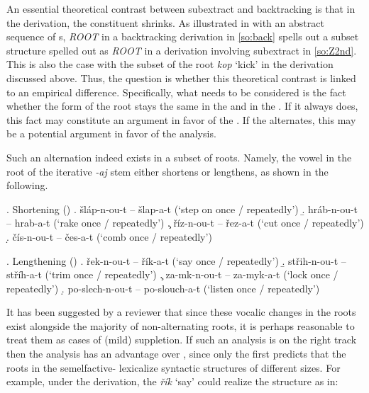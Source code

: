 An essential theoretical contrast between subextract and backtracking is that in the  derivation, the  constituent shrinks.  As illustrated in  with an abstract sequence of s, \textit{ROOT} in a backtracking derivation in \ref{so:back} spells out a subset structure spelled out as \textit{ROOT} in a derivation involving subextract in \ref{so:Z2nd}. This is also the case with the subset  of the root \textit{kop} `kick' in the  derivation discussed above. 
Thus, the question is whether this theoretical contrast is linked to an empirical difference. Specifically, what needs to be considered is the fact whether the form of the root stays the same in the  and in the . If it always does, this fact may constitute an argument in favor of the . If the  alternates, this may be a potential argument in favor of the  analysis.
\par
Such an alternation indeed exists in a subset of  roots. Namely, the vowel in the root of the iterative \textit{-aj} stem either shortens or lengthens, as shown in the following.

\ex.\label{short} Shortening ()
\a. \v{s}l\'ap-n-ou-t -- \v{s}lap-a-t (`step on once / repeatedly')
\b.  hr\'ab-n-ou-t -- hrab-a-t (`rake once / repeatedly')
\c. \v{r}\'iz-n-ou-t -- \v{r}ez-a-t (`cut once / repeatedly')
\d. \v{c}\'is-n-ou-t -- \v{c}es-a-t (`comb once / repeatedly')

\ex.\label{leng} Lengthening ()
\a. \v{r}ek-n-ou-t -- \v{r}\'ik-a-t (`say once / repeatedly')
\b. st\v{r}ih-n-ou-t -- st\v{r}\'ih-a-t (`trim once / repeatedly')
\c. za-mk-n-ou-t -- za-myk-a-t (`lock once / repeatedly')
\d. po-slech-n-ou-t -- po-slouch-a-t (`listen once / repeatedly')

It has been suggested by a reviewer that since these vocalic changes in the roots exist alongside the majority of non-alternating roots, it is perhaps reasonable to treat them as cases of (mild) suppletion. If such an analysis is on the right track then the  analysis has an advantage over , since only the first predicts that the roots in the  semelfactive- lexicalize syntactic structures of different sizes. For example, under the  derivation, the  \textit{\v{r}\'ik} `say' could realize the structure as in: 

